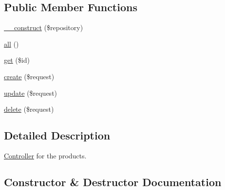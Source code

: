 \subsection*{Public Member Functions}
\begin{DoxyCompactItemize}
\item 
\mbox{\hyperlink{class_app_1_1_http_1_1_controllers_1_1_product_1_1_product_controller_a5b75ba6bc9debb999c0186a31978ec03}{\+\_\+\+\_\+construct}} (\$repository)
\item 
\mbox{\hyperlink{class_app_1_1_http_1_1_controllers_1_1_product_1_1_product_controller_af9d14e4ae6227970ad603987781573ca}{all}} ()
\item 
\mbox{\hyperlink{class_app_1_1_http_1_1_controllers_1_1_product_1_1_product_controller_a50e3bfb586b2f42932a6a93f3fbb0828}{get}} (\$id)
\item 
\mbox{\hyperlink{class_app_1_1_http_1_1_controllers_1_1_product_1_1_product_controller_a4fa811c83f27da01b0d92bdb2a711a13}{create}} (\$request)
\item 
\mbox{\hyperlink{class_app_1_1_http_1_1_controllers_1_1_product_1_1_product_controller_ab7b27a90191560dcef32126b0945db0d}{update}} (\$request)
\item 
\mbox{\hyperlink{class_app_1_1_http_1_1_controllers_1_1_product_1_1_product_controller_a126a3799c44d72393ca4732081306dfd}{delete}} (\$request)
\end{DoxyCompactItemize}


\subsection{Detailed Description}
\mbox{\hyperlink{class_app_1_1_http_1_1_controllers_1_1_controller}{Controller}} for the products. 

\subsection{Constructor \& Destructor Documentation}
\mbox{\label{class_app_1_1_http_1_1_controllers_1_1_product_1_1_product_controller_a5b75ba6bc9debb999c0186a31978ec03}} 
